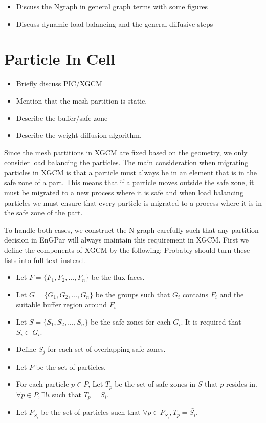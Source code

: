 \documentclass[conference]{IEEEtran}
\begin{document}
\begin{itemize}
\item Discuss the Ngraph in general graph terms with some figures
\item Discuss dynamic load balancing and the general diffusive steps
\end{itemize}

\section{Particle In Cell}

\begin{itemize}
\item Briefly discuss PIC/XGCM
\item Mention that the mesh partition is static.
\item Describe the buffer/safe zone
\item Describe the weight diffusion algorithm.
\end{itemize}

Since the mesh partitions in XGCM are fixed based on the geometry, we only consider
load balancing the particles. The main consideration when migrating particles in XGCM
is that a particle must always be in an element that is in the safe zone of a part.
This means that if a particle moves outside the safe zone, it must be migrated to a
new process where it is safe and when load balancing particles we must ensure that every
particle is migrated to a process where it is in the safe zone of the part.

To handle both cases, we construct the N-graph carefully such that any partition
decision in EnGPar will always maintain this requirement in XGCM. First we define
the components of XGCM by the following: {\color{red} Probably should turn these lists
  into full text instead.}
\begin{itemize}
\item Let $F = \{F_1,F_2, ..., F_n\}$ be the flux faces.
\item Let $G = \{G_1, G_2, ..., G_n\}$ be the groups such that $G_i$
  contains $F_i$ and the suitable buffer region around $F_i$
\item Let $S = \{S_1,S_2,...,S_n\}$ be the safe zones for each $G_i$.
  It is required that $S_i \subset G_i$.
\item Define $\bar{S_j}$ for each set of overlapping safe zones.
\item Let $P$ be the set of particles.
\item For each particle $p\in P$, Let $T_p$ be the set of safe zones in $S$ that $p$ resides
  in.  $\forall p \in P, \exists ! i$ such that $T_p = \bar{S_i}$.
\item  Let $P_{\bar{S_i}}$ be the set of particles such that $\forall p \in P_{\bar{S_i}}, T_p = \bar{S_i}$.
\end{itemize}
\end{document}
